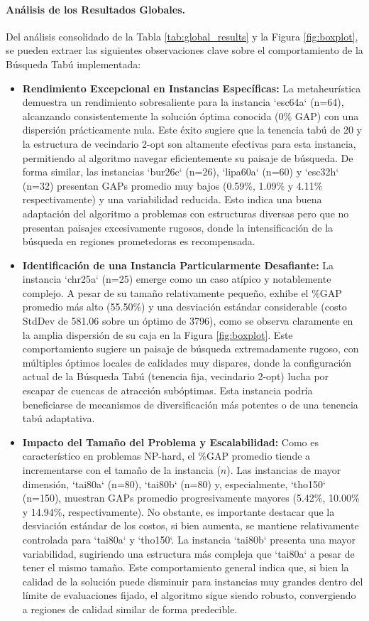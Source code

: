 \documentclass[12pt, a4paper]{article}
\begin{document}
\paragraph{Análisis de los Resultados Globales.}
Del análisis consolidado de la Tabla \ref{tab:global_results} y la Figura \ref{fig:boxplot}, se pueden extraer las siguientes observaciones clave sobre el comportamiento de la Búsqueda Tabú implementada:
\begin{itemize}
    \item \textbf{Rendimiento Excepcional en Instancias Específicas:} La metaheurística demuestra un rendimiento sobresaliente para la instancia `esc64a` (n=64), alcanzando consistentemente la solución óptima conocida (0\% GAP) con una dispersión prácticamente nula. Este éxito sugiere que la tenencia tabú de 20 y la estructura de vecindario 2-opt son altamente efectivas para esta instancia, permitiendo al algoritmo navegar eficientemente su paisaje de búsqueda. De forma similar, las instancias `bur26c` (n=26), `lipa60a` (n=60) y `esc32h` (n=32) presentan GAPs promedio muy bajos (0.59\%, 1.09\% y 4.11\% respectivamente) y una variabilidad reducida. Esto indica una buena adaptación del algoritmo a problemas con estructuras diversas pero que no presentan paisajes excesivamente rugosos, donde la intensificación de la búsqueda en regiones prometedoras es recompensada.

    \item \textbf{Identificación de una Instancia Particularmente Desafiante:} La instancia `chr25a` (n=25) emerge como un caso atípico y notablemente complejo. A pesar de su tamaño relativamente pequeño, exhibe el \%GAP promedio más alto (55.50\%) y una desviación estándar considerable (costo StdDev de 581.06 sobre un óptimo de 3796), como se observa claramente en la amplia dispersión de su caja en la Figura \ref{fig:boxplot}. Este comportamiento sugiere un paisaje de búsqueda extremadamente rugoso, con múltiples óptimos locales de calidades muy dispares, donde la configuración actual de la Búsqueda Tabú (tenencia fija, vecindario 2-opt) lucha por escapar de cuencas de atracción subóptimas. Esta instancia podría beneficiarse de mecanismos de diversificación más potentes o de una tenencia tabú adaptativa.

    \item \textbf{Impacto del Tamaño del Problema y Escalabilidad:} Como es característico en problemas NP-hard, el \%GAP promedio tiende a incrementarse con el tamaño de la instancia (\(n\)). Las instancias de mayor dimensión, `tai80a` (n=80), `tai80b` (n=80) y, especialmente, `tho150` (n=150), muestran GAPs promedio progresivamente mayores (5.42\%, 10.00\% y 14.94\%, respectivamente). No obstante, es importante destacar que la desviación estándar de los costos, si bien aumenta, se mantiene relativamente controlada para `tai80a` y `tho150`. La instancia `tai80b` presenta una mayor variabilidad, sugiriendo una estructura más compleja que `tai80a` a pesar de tener el mismo tamaño. Este comportamiento general indica que, si bien la calidad de la solución puede disminuir para instancias muy grandes dentro del límite de evaluaciones fijado, el algoritmo sigue siendo robusto, convergiendo a regiones de calidad similar de forma predecible.


\end{itemize}
\end{document}
